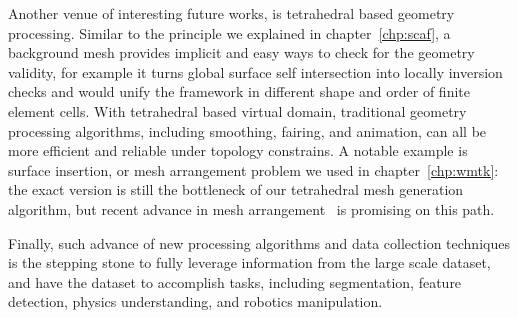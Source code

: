 Another venue of interesting future works, is tetrahedral based geometry processing. Similar to the principle we explained in chapter~\ref{chp:scaf}, a background mesh provides implicit and easy ways to check for the geometry validity, for example it turns global surface self intersection into locally inversion checks and would unify the framework in different shape and order of finite element cells. With tetrahedral based virtual domain, traditional geometry processing algorithms, including smoothing, fairing, and animation, can all be more efficient and reliable under topology constrains. A notable example is surface insertion, or mesh arrangement problem we used in chapter~\ref{chp:wmtk}: the exact version is still the bottleneck of our tetrahedral mesh generation algorithm, but recent advance in mesh arrangement~\cite{Hu:2019:fTetWild,zhou2016mesh,ember2022} is promising on this path.

Finally, such advance of new processing algorithms and data collection techniques is the stepping stone to fully leverage information from the large scale dataset\cite{Koch_2019_CVPR,zhou2016thingi10k}, and have the dataset to accomplish tasks, including segmentation, feature detection, physics understanding, and robotics manipulation.
